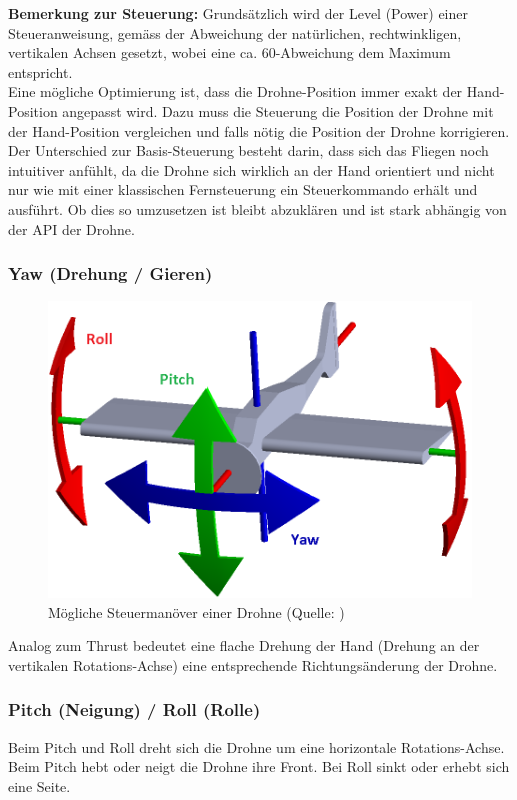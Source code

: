 \textbf{Bemerkung zur Steuerung:} Grundsätzlich wird der Level (Power) einer Steueranweisung, gemäss der Abweichung der natürlichen, rechtwinkligen, vertikalen Achsen gesetzt, wobei eine ca. 60\textdegree-Abweichung dem Maximum entspricht.\\
Eine mögliche Optimierung ist, dass die Drohne-Position immer exakt der Hand-Position angepasst wird.
Dazu muss die Steuerung die Position der Drohne mit der Hand-Position vergleichen und falls nötig die Position der Drohne korrigieren.
Der Unterschied zur Basis-Steuerung besteht darin, dass sich das Fliegen noch intuitiver anfühlt, da die Drohne sich wirklich an der Hand orientiert und nicht nur wie mit einer klassischen Fernsteuerung ein Steuerkommando erhält und ausführt.
Ob dies so umzusetzen ist bleibt abzuklären und ist stark abhängig von der API der Drohne.

\subsubsection{Yaw (Drehung / Gieren)}
\begin{figure}
	\includegraphics[width=1.0\linewidth]{images/concept/yaw_pitch_roll.png}
	\caption[Steuermanöver]{Mögliche Steuermanöver einer Drohne (Quelle: )}
\end{figure}
Analog zum Thrust bedeutet eine flache Drehung der Hand (Drehung an der vertikalen Rotations-Achse) eine entsprechende Richtungsänderung der Drohne.

\subsubsection{Pitch (Neigung) / Roll (Rolle)}
Beim Pitch und Roll dreht sich die Drohne um eine horizontale Rotations-Achse. Beim Pitch hebt oder neigt die Drohne ihre Front. Bei Roll sinkt oder erhebt sich eine Seite.

